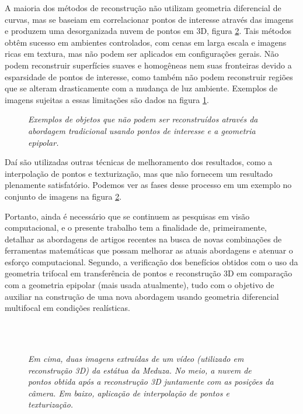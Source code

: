 A maioria dos métodos de reconstrução não utilizam geometria diferencial de curvas, mas se baseiam em correlacionar pontos de interesse através das imagens e produzem uma desorganizada nuvem de pontos em 3D, figura \ref{fig.medusa}. Tais métodos obtêm sucesso em ambientes controlados, com cenas em larga escala e imagens ricas em textura, mas não podem ser aplicados em configurações gerais. Não podem reconstruir superfícies suaves e homogêneas nem suas fronteiras devido a esparsidade de pontos de interesse, como também não podem reconstruir regiões que se alteram drasticamente com a mudança de luz ambiente. Exemplos de imagens sujeitas a essas limitações são dados na figura \ref{fig.carro-objeto-curvo}.
\begin{figure}[!htb]
\centering
{}
\quad
{}
\caption{{\it Exemplos de objetos que não podem ser reconstruídos através da abordagem tradicional usando pontos de interesse e a geometria epipolar.}}
\label{fig.carro-objeto-curvo}
\end{figure}  
Daí são utilizadas outras técnicas de melhoramento dos resultados, como a interpolação de pontos e texturização, mas que não fornecem um resultado plenamente satisfatório. Podemos ver as fases desse processo em um exemplo no conjunto de imagens na figura \ref{fig.medusa}.

Portanto, ainda é necessário que se continuem as pesquisas em visão computacional, e o presente trabalho tem a finalidade de, primeiramente, detalhar as abordagens de artigos recentes na busca de novas combinações de ferramentas matemáticas que possam melhorar as atuais abordagens e atenuar o esforço computacional. Segundo, a verificação dos benefícios obtidos com o uso da geometria trifocal em transferência de pontos e reconstrução 3D em comparação com a geometria epipolar (mais usada atualmente), tudo com o objetivo de auxiliar na construção de uma nova abordagem usando geometria diferencial multifocal em condições realísticas.

\begin{figure}[!htb]
\centering
{}
\quad
{}
\\
\quad
{}
\\
\quad
{}
\caption{{\it Em cima, duas imagens extraídas de um vídeo (utilizado em reconstrução 3D) da estátua da Meduza. No meio, a nuvem de pontos obtida após a reconstrução 3D juntamente com as posições da câmera. Em baixo, aplicação de interpolação de pontos e texturização.}}
\label{fig.medusa}
\end{figure}

